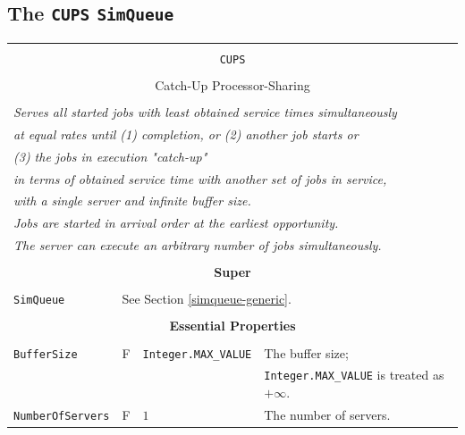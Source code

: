 \documentclass[12pt]{book}
\begin{document}
\subsection{The \lstinline{CUPS} \lstinline{SimQueue}}
\label{sec:CUPS}

\begin{tabular}{|l|l|l|l|}
\hline
\multicolumn{4}{|c|}{} \\
\multicolumn{4}{|c|}{\lstinline[basicstyle=\large]{CUPS}} \\
\multicolumn{4}{|c|}{} \\
\multicolumn{4}{|c|}{Catch-Up Processor-Sharing} \\
\multicolumn{4}{|c|}{} \\
\hline
\multicolumn{4}{|l|}{\em Serves all started jobs with least obtained service times simultaneously} \\
\multicolumn{4}{|l|}{\em at equal rates until (1) completion, or (2) another job starts or} \\
\multicolumn{4}{|l|}{\em (3) the jobs in execution "catch-up"} \\
\multicolumn{4}{|l|}{\em in terms of obtained service time with another set of jobs in service,} \\
\multicolumn{4}{|l|}{\em with a single server and infinite buffer size.} \\
\multicolumn{4}{|l|}{\em Jobs are started in arrival order at the earliest opportunity.} \\
\multicolumn{4}{|l|}{\em The server can execute an arbitrary number of jobs simultaneously.} \\
\hline
\multicolumn{4}{|c|}{} \\
\multicolumn{4}{|c|}{\bf Super} \\
\multicolumn{4}{|c|}{} \\
\hline
\lstinline|SimQueue| & \multicolumn{3}{|l|}{See Section \ref{simqueue-generic}.} \\
\hline
\multicolumn{4}{|c|}{} \\
\multicolumn{4}{|c|}{\bf Essential Properties} \\
\multicolumn{4}{|c|}{} \\
\hline
\lstinline|BufferSize|      & F & \lstinline|Integer.MAX_VALUE|
                            & The buffer size; \\
                        & & & \lstinline|Integer.MAX_VALUE| is treated as $+\infty$. \\
\hline
\lstinline|NumberOfServers|    & F & $1$
                               & The number of servers. \\

\end{tabular}
\end{document}
